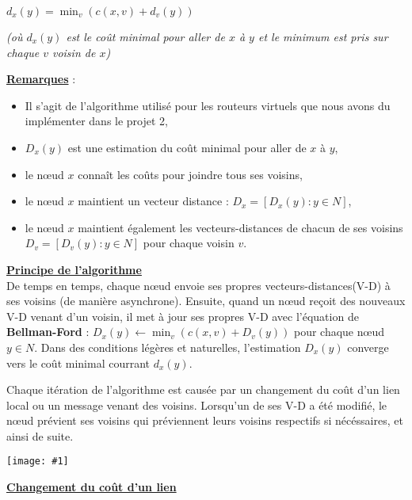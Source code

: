 \documentclass{article}
\newcommand{\imgRT}[2]{\begin{center}\texttt{[image: \#1]}\end{center}}
\begin{document}
\begin{center}$\boxed{d_x(y) = \min_v\left(c(x,v)+d_v(y)\right)}$\end{center}

\textit{(où $d_x(y)$ est le coût minimal pour aller de $x$ à $y$ et le minimum est pris sur chaque $v$ voisin de 
$x$)}

\textbf{\underline{Remarques}} : 
\begin{itemize}
\item Il s'agit de l'algorithme utilisé pour les routeurs virtuels que nous avons du implémenter dans le projet 
2,
\item $D_x(y)$ est une estimation du coût minimal pour aller de $x$ à $y$,
\item le n\oe ud $x$ connaît les coûts pour joindre tous ses voisins,
\item le n\oe ud $x$ maintient un vecteur distance : $D_x = [D_x(y):y\in N]$,
\item le n\oe ud $x$ maintient également les vecteurs-distances de chacun de ses voisins $D_v = [D_v(y):y\in N]$ 
pour chaque voisin $v$. \\
\end{itemize}

\noindent\textbf{\underline{Principe de l'algorithme}} \\

De temps en temps, chaque n\oe ud envoie ses propres vecteurs-distances(V-D) à ses voisins (de manière
asynchrone). 
Ensuite, quand un n\oe ud reçoit des nouveaux V-D venant d'un voisin, il met à jour ses propres V-D avec 
l'équation de \textbf{Bellman-Ford} : $D_x(y) \leftarrow \min_v\left(c(x,v)+D_v(y)\right)$ pour chaque n\oe ud $y 
\in N$. Dans des conditions légères et naturelles, l'estimation $D_x(y)$ converge vers le coût minimal courrant 
$d_x(y)$.

\begin{multicols}{2}
\noindent Chaque itération de l'algorithme est causée par un changement du coût d'un lien local ou un message
venant des voisins. Lorsqu'un de ses V-D a été modifié, le n\oe ud prévient ses voisins qui préviennent leurs 
voisins respectifs si nécéssaires, et ainsi de suite.
\imgRT{CN_088.png}{125}
\end{multicols}
\newpage
\noindent\textbf{\underline{Changement du coût d'un lien}}\\
\end{document}

